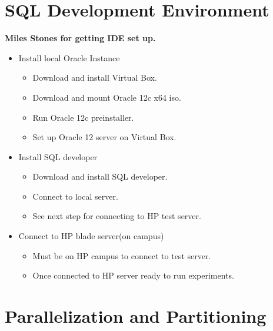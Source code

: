 \documentclass[draftclsnofoot, onecolumn, compsoc, 10pt]{IEEEtran}
\begin{document}
\section{SQL Development Environment}
\textbf{Miles Stones for getting IDE set up.}
\begin{itemize} 
	\item Install local Oracle Instance
    \begin{itemize}
    	\item Download and install Virtual Box.
        \item Download and mount Oracle 12c x64 iso.
        \item Run Oracle 12c preinstaller.
        \item Set up Oracle 12 server on Virtual Box.
    \end{itemize}
    \item Install SQL developer
    \begin{itemize}
    	\item Download and install SQL developer.
        \item Connect to local server.
        \item See next step for connecting to HP test server. 
    \end{itemize}
    \item Connect to HP blade server(on campus)
    \begin{itemize}
    	\item Must be on HP campus to connect to test server.
        \item Once connected to HP server ready to run experiments. 
    \end{itemize}
\end{itemize}
\section{Parallelization and Partitioning}
\end{document}
